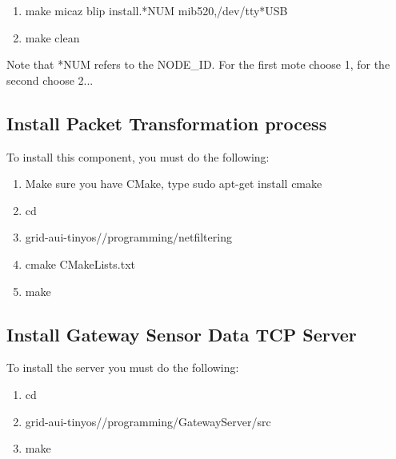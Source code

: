 \documentclass[oneside,12pt,a4paper,final]{book}
\begin{document}
\begin{enumerate}
\item  make micaz blip install.*NUM mib520,/dev/tty*USB
\item make clean
\end{enumerate}
Note that *NUM refers to the NODE\_ID. For the first mote choose 1, for the second choose 2...

\subsection{Install Packet Transformation process}
To install this component, you must do the following:
\begin{enumerate}
\item Make sure you have CMake, type sudo apt-get install cmake
\item cd
\item grid-aui-tinyos//programming/netfiltering
\item cmake CMakeLists.txt
\item make
\end{enumerate}

\subsection{Install Gateway Sensor Data TCP Server}
To install the server you must do the following:
\begin{enumerate}
\item cd
\item grid-aui-tinyos//programming/GatewayServer/src
\item make
\end{enumerate}
\end{document}
